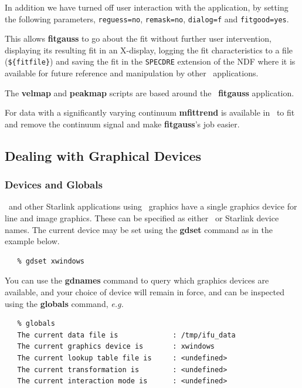 \documentclass[twoside,11pt]{article}
\newcommand{\xref}[3]{#1}
\newcommand{\xlabel}[1]{}
\begin{document}
\begin{\htmlonly}
{In addition we have turned off user interaction with the application,
by setting the following parameters, \verb+reguess=no+,
\verb+remask=no+, \verb+dialog=f+ and \verb+fitgood=yes+.

This allows {\bf fitgauss} to go about the fit without further user
intervention, displaying its resulting fit in an X-display, logging
the fit characteristics to a file (\verb+${fitfile}+) and saving the
fit in the \xref{{\tt SPECDRE} extension}{sun86}{extension}
 of the NDF where it is available
for future reference and manipulation by other \SPECDRE\ applications.

The \xref{{\bf velmap}}{sun237}{velmap} and \xref{{\bf
peakmap}}{sun237}{peakmap} scripts are based around the \SPECDRE\
{\bf fitgauss} application.

For data with a significantly varying continuum \xref{{\bf
mfittrend}}{sun95}{MFITTREND} is available in \KAPPA\ to fit and
remove the continuum signal and make {\bf fitgauss}'s job easier.

\subsection{\label{sc16_graphics}Dealing with Graphical Devices\xlabel{sc16_graphics}}

\subsubsection{Devices and Globals}

\KAPPAref\ and other Starlink applications using \PGPLOTref\ graphics
have a single \xref{graphics device}{sun95}{se_graphdev} for line and
image graphics.  These can be specified as either \xref{\PGPLOT\ or
Starlink device names}{sun95}{se_selgradev}.  The current device may
be set using the \xref{{\bf gdset}}{sun95}{GDSET} command as in the example
below.

\small\begin{verbatim}
   % gdset xwindows
\end{verbatim}\normalsize

You can use the \xref{{\bf gdnames}}{sun95}{GDNAMES} command to query which
graphics devices are available, and your choice of device will remain
in force, and can be inspected using the
\xref{{\bf globals}}{sun95}{GLOBALS} command, \emph{e.g.}\

\small\begin{verbatim}
   % globals
   The current data file is             : /tmp/ifu_data
   The current graphics device is       : xwindows
   The current lookup table file is     : <undefined>
   The current transformation is        : <undefined>
   The current interaction mode is      : <undefined>
\end{verbatim}\normalsize

}
\end{\htmlonly}
\end{document}
